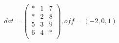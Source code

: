 \documentclass[11pt,a4paper,twoside]{report}
\begin{document}
      \[ dat = 
	 	\begin{pmatrix}
  		  	*	&	1	& 7	\\
  		  	*	&	2	&	8	\\
   		 	5	&	3	&	9	\\
    		6	&	4	&	*	\\
    \end{pmatrix} , off = (-2, 0, 1)    
     \] 
  
  
  
  



  
\end{document}
